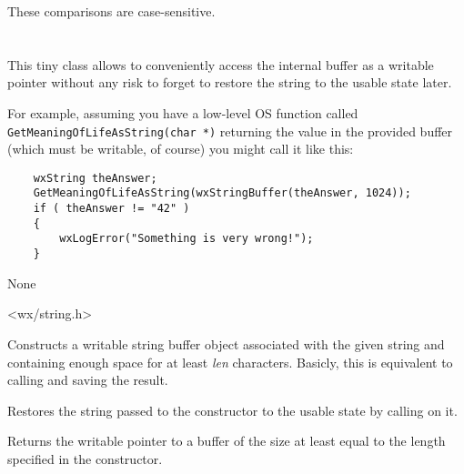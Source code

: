 



These comparisons are case-sensitive.


\section{}\label{wxstringbuffer}

This tiny class allows to conveniently access the  
internal buffer as a writable pointer without any risk to forget to restore
the string to the usable state later.

For example, assuming you have a low-level OS function called 
{\tt GetMeaningOfLifeAsString(char *)} returning the value in the provided
buffer (which must be writable, of course) you might call it like this:

\begin{verbatim}
    wxString theAnswer;
    GetMeaningOfLifeAsString(wxStringBuffer(theAnswer, 1024));
    if ( theAnswer != "42" )
    {
        wxLogError("Something is very wrong!");
    }
\end{verbatim}


None


<wx/string.h>




Constructs a writable string buffer object associated with the given string
and containing enough space for at least {\it len} characters. Basicly, this
is equivalent to calling  and
saving the result.



Restores the string passed to the constructor to the usable state by calling 
 on it.



Returns the writable pointer to a buffer of the size at least equal to the
length specified in the constructor.



